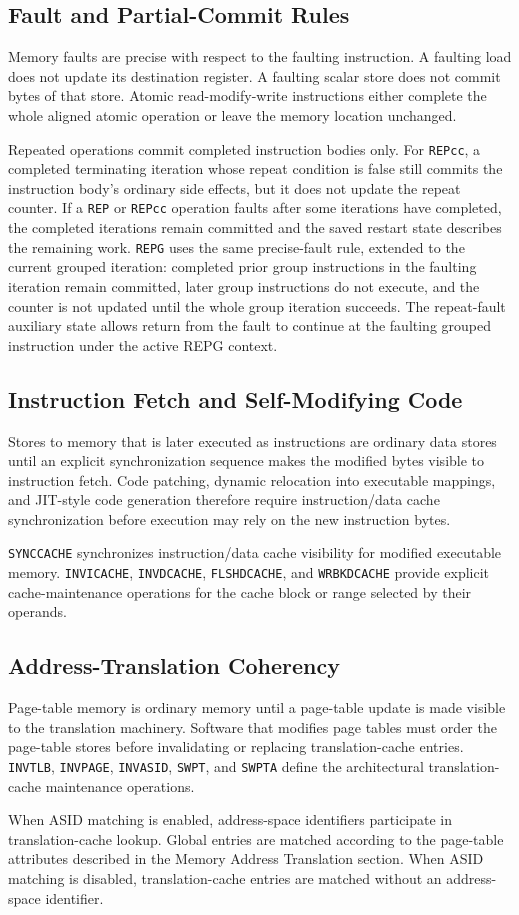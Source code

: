\subsection{Fault and Partial-Commit Rules}
Memory faults are precise with respect to the faulting instruction. A faulting load does
not update its destination register. A faulting scalar store does not commit bytes of that
store. Atomic read-modify-write instructions either complete the whole aligned atomic
operation or leave the memory location unchanged.

Repeated operations commit completed instruction bodies only. For \texttt{REPcc}, a
completed terminating iteration whose repeat condition is false still commits the
instruction body's ordinary side effects, but it does not update the repeat counter. If a
\texttt{REP} or \texttt{REPcc} operation faults after some iterations have completed, the
completed iterations remain committed and the saved restart state describes the remaining
work.
\texttt{REPG} uses the same precise-fault rule, extended to the current grouped
iteration: completed prior group instructions in the faulting iteration remain
committed, later group instructions do not execute, and the counter is not
updated until the whole group iteration succeeds. The repeat-fault auxiliary
state allows return from the fault to continue at the faulting grouped
instruction under the active REPG context.

\subsection{Instruction Fetch and Self-Modifying Code}
Stores to memory that is later executed as instructions are ordinary data stores until an
explicit synchronization sequence makes the modified bytes visible to instruction fetch.
Code patching, dynamic relocation into executable mappings, and JIT-style code generation
therefore require instruction/data cache synchronization before execution may rely on the
new instruction bytes.

\texttt{SYNCCACHE} synchronizes instruction/data cache visibility for modified executable
memory. \texttt{INVICACHE}, \texttt{INVDCACHE}, \texttt{FLSHDCACHE}, and \texttt{WRBKDCACHE}
provide explicit cache-maintenance operations for the cache block or range selected by their
operands.

\subsection{Address-Translation Coherency}
Page-table memory is ordinary memory until a page-table update is made visible to the
translation machinery. Software that modifies page tables must order the page-table stores
before invalidating or replacing translation-cache entries. \texttt{INVTLB}, \texttt{INVPAGE},
\texttt{INVASID}, \texttt{SWPT}, and \texttt{SWPTA} define the architectural translation-cache
maintenance operations.

When ASID matching is enabled, address-space identifiers participate in translation-cache
lookup. Global entries are matched according to the page-table attributes described in the
Memory Address Translation section. When ASID matching is disabled, translation-cache entries
are matched without an address-space identifier.
